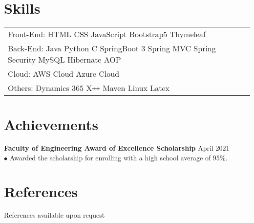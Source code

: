 \documentclass[letterpaper,12pt]{article}
\begin{document}
\section{Skills}
\begin{tabularx}{\linewidth}{@{}l X@{}}
Front-End: \hspace{0.05cm} HTML \hspace{0.05cm} CSS \hspace{0.2cm} JavaScript \hspace{0.2cm} Bootstrap5 \hspace{0.2cm} Thymeleaf \\
Back-End: \hspace{0.05cm} Java \hspace{0.1cm} Python \hspace{0.1cm} C \hspace{0.1cm} SpringBoot 3 \hspace{0.05cm} Spring MVC \hspace{0.1cm} Spring Security \hspace{0.1cm} MySQL \hspace{0.1cm} Hibernate \hspace{0.1cm} AOP \\
Cloud:  \hspace{0.75cm} AWS Cloud \hspace{0.2cm} Azure Cloud \hspace{0.6cm}  \\
Others: \hspace{0.57cm} Dynamics 365 \hspace{0.1cm} X\texttt{++} \hspace{0.1cm} Maven \hspace{0.1cm} Linux \hspace{0.1cm} Latex \\
\end{tabularx}

\section{Achievements}
\textbf{Faculty of Engineering Award of Excellence Scholarship}  \hfill  \normalsize{April 2021} \\
$\bullet$ Awarded the scholarship for enrolling with a high school average of 95\%.
\section{References}
References available upon request
\end{document}

